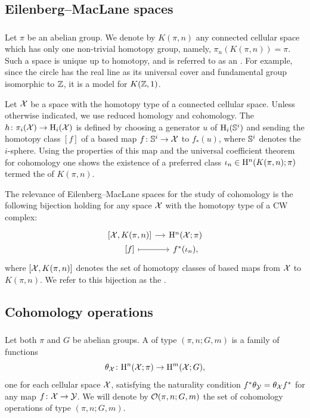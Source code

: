 \subsection{Eilenberg--MacLane spaces}

\subsubsection{}

Let $\pi$ be an abelian group.
We denote by $K(\pi, n)$ any connected cellular space which has only one non-trivial homotopy group, namely, $\pi_n(K(\pi, n)) = \pi$.
Such a space is unique up to homotopy, and is referred to as an .
For example, since the circle has the real line as its universal cover and fundamental group isomorphic to $\mathbb{Z}$, it is a model for $K(\mathbb{Z},1)$.

Let $\mathcal{X}$ be a space with the homotopy type of a connected cellular space.
Unless otherwise indicated, we use reduced homology and cohomology.
The  $h \colon \pi_i(\mathcal{X}) \to \mathrm{H}_i(\mathcal{X})$ is defined by choosing a generator $u$ of $\mathrm{H}_i(\mathbb{S}^i)$ and sending the homotopy class $[f]$ of a based map $f \colon \mathbb{S}^i \to \mathcal{X}$ to $f_*(u)$, where $\mathbb{S}^i$ denotes the $i$-sphere.
Using the properties of this map and the universal coefficient theorem for cohomology one shows the existence of a preferred class $\iota_n \in \mathrm{H}^n(K(\pi, n); \pi)$ termed the  of $K(\pi, n)$.

The relevance of Eilenberg--MacLane spaces for the study of cohomology is the following bijection holding for any space \(\mathcal{X}\) with the homotopy type of a CW complex:
\[
\begin{tikzcd}[column sep=small, row sep=0]
	{[\cX, K(\pi, n)]} \rar & \rH^n(\cX; \pi) \\
	{[f]} \rar[maps to] & f^*(\iota_n),
\end{tikzcd}
\]
where $[\mathcal{X}, K(\pi, n)]$ denotes the set of homotopy classes of based maps from $\mathcal{X}$ to $K(\pi, n)$.
We refer to this bijection as the .

\subsection{Cohomology operations}

\subsubsection{}
Let both $\pi$ and $G$ be abelian groups.
A  of type $(\pi, n; G, m)$ is a family of functions
\[
\theta_{\mathcal{X}} \colon \mathrm{H}^n(\mathcal{X}; \pi) \to \mathrm{H}^m(\mathcal{X}; G),
\]
one for each cellular space $\mathcal{X}$, satisfying the naturality condition $f^* \theta_{\mathcal{Y}} = \theta_{\mathcal{X}} f^*$ for any map $f \colon \mathcal{X} \to \mathcal{Y}$.
We will denote by $\mathcal{O}(\pi, n; G,m)$ the set of cohomology operations of type $(\pi, n; G,m)$.

